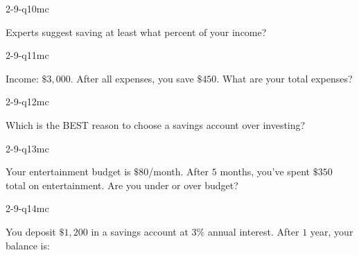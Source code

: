 \begin{practiceQuestion}{2-9-q10}{mc}
\begin{questionText}
Experts suggest saving at least what percent of your income?
\end{questionText}
\end{practiceQuestion}

\begin{practiceQuestion}{2-9-q11}{mc}
\begin{questionText}
Income: $\$3{,}000$. After all expenses, you save $\$450$. What are your total expenses?
\end{questionText}
\end{practiceQuestion}

\begin{practiceQuestion}{2-9-q12}{mc}
\begin{questionText}
Which is the BEST reason to choose a savings account over investing?
\end{questionText}
\end{practiceQuestion}

\begin{practiceQuestion}{2-9-q13}{mc}
\begin{questionText}
Your entertainment budget is $\$80$/month. After $5$ months, you've spent $\$350$ total on entertainment. Are you under or over budget?
\end{questionText}
\end{practiceQuestion}

\begin{practiceQuestion}{2-9-q14}{mc}
\begin{questionText}
You deposit $\$1{,}200$ in a savings account at $3\%$ annual interest. After $1$ year, your balance is:
\end{questionText}
\end{practiceQuestion}

